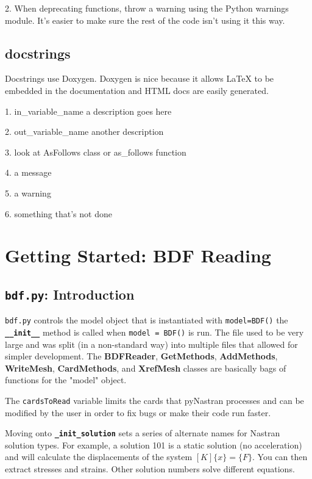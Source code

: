      2.  When deprecating functions, throw a warning using the Python warnings module.  It's easier to make sure the rest of the code isn't using it this way.

 \subsection{docstrings}
     Docstrings use Doxygen.  Doxygen is nice because it allows LaTeX to be
     embedded in the documentation and HTML docs are easily generated.
     
     1.  \@param  in\_variable\_name a description goes here

     2.  \@retval out\_variable\_name another description

     3.  \@see    look at AsFollows class or as\_follows function

     4.  \@note   a message

     5.  \@warning a warning

     6.  \@todo   something that's not done
     
     

\section{Getting Started: BDF Reading}
 \subsection{{\tt bdf.py}:  Introduction}
     {\tt bdf.py} controls the model object that is instantiated with      {\tt model=BDF()} the {\bf \tt \_\_init\_\_} method is called when {\tt model = BDF()} is run.  The file used to be very large and was split (in a non-standard way) into multiple files that allowed for simpler development.  The {\bf BDFReader}, {\bf GetMethods}, {\bf AddMethods}, {\bf WriteMesh},
     {\bf CardMethods}, and {\bf XrefMesh} classes are basically bags of functions for the "model" object.
     
     The {\tt cardsToRead} variable limits the cards that pyNastran processes and     can be modified by the user in order to fix bugs or make their code run faster.
     
     Moving onto {\bf \tt \_init\_solution} sets a series of alternate names for Nastran solution types.  For example, a solution 101 is a static solution (no acceleration) and will calculate the displacements of the system $[K]\{x\} = \{F\} $.  You can then extract stresses and strains.  Other solution numbers solve different equations.
     
